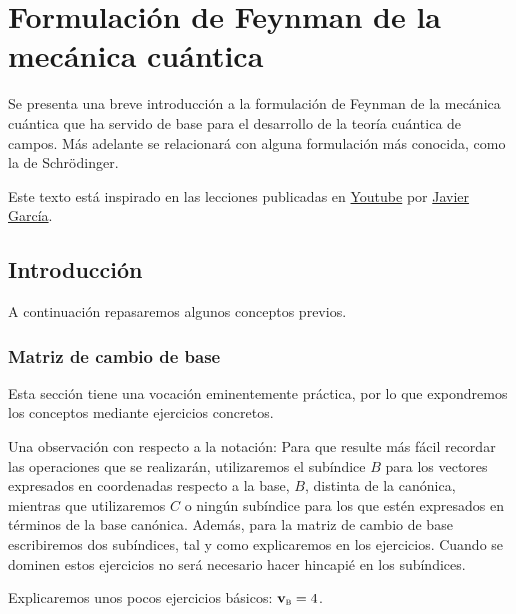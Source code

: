 %
%

\chapter{Formulación de Feynman de la mecánica cuántica}
Se presenta una breve introducción a la formulación de Feynman de la
mecánica cuántica que ha servido de base para el desarrollo de la
teoría cuántica de campos. Más adelante se relacionará con alguna
formulación más conocida, como la de Schrödinger.

Este texto está inspirado en las lecciones publicadas en
\href{https://www.youtube.com/watch?v=Ck0WwQiYTwo&list=PLAnA8FVrBl8DwNkN_3f_vahmE0PHjBWQM}
{Youtube}
por
\href{https://www.patreon.com/JavierGarcia/}
{Javier García}.

\section{Introducción}
A continuación repasaremos algunos conceptos previos.

\subsection{Matriz de cambio de base}
Esta sección tiene una vocación eminentemente práctica, por lo que
expondremos los conceptos mediante ejercicios concretos.

Una observación con respecto a la notación: Para que resulte más fácil
recordar las operaciones que se realizarán, utilizaremos el subíndice
$B$ para los vectores expresados en coordenadas respecto a la base,
$B$, distinta de la canónica, mientras que utilizaremos $C$ o ningún
subíndice para los que estén expresados en términos de la base
canónica. Además, para la matriz de cambio de base escribiremos dos
subíndices, tal y como explicaremos en los ejercicios. Cuando se
dominen estos ejercicios no será necesario hacer hincapié en los
subíndices.

Explicaremos unos pocos ejercicios básicos: $\mathbf{v}_{\textsc{b}} = 4$.

